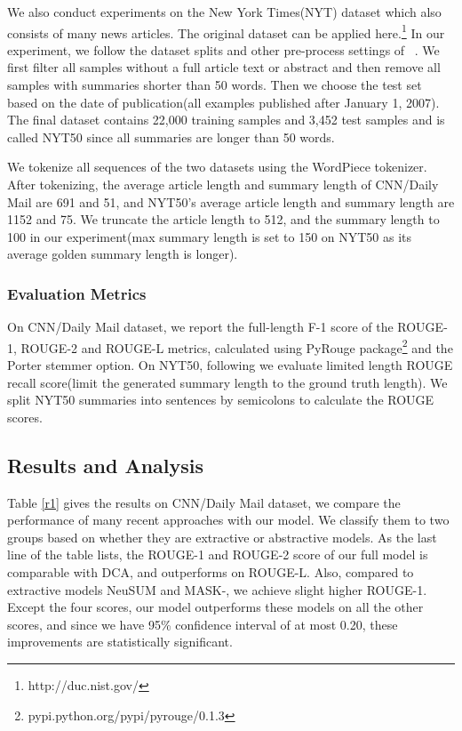 \documentclass{article}
\begin{document}
We also conduct experiments on the New York Times(NYT) dataset which also consists of many news articles. The original dataset can be applied here.\footnote{http://duc.nist.gov/} In our experiment, we follow the dataset splits and other pre-process settings of ~\cite{Durrett2016}.  We first filter all samples without a full article text or abstract and then remove all samples with summaries shorter than 50 words. Then we choose the test set based on the date of publication(all examples published after January 1, 2007). The final dataset contains 22,000 training samples and 3,452 test samples and is called NYT50 since all summaries are longer than 50 words.

We tokenize all sequences of the two datasets using the WordPiece tokenizer. After tokenizing, the average article length and summary length of CNN/Daily Mail are 691 and 51, and NYT50's average article length and summary length are 1152 and 75. We truncate the article length to 512, and the summary length to 100 in our experiment(max summary length is set to 150 on NYT50 as its average golden summary length is longer).


\subsubsection{Evaluation Metrics}
On CNN/Daily Mail dataset, we report the full-length F-1 score of the ROUGE-1, ROUGE-2 and ROUGE-L metrics, calculated using PyRouge package\footnote{pypi.python.org/pypi/pyrouge/0.1.3} and the Porter stemmer option. On NYT50, following \cite{Paulus2018} we evaluate limited length ROUGE recall score(limit the generated summary length to the ground truth length). We split NYT50 summaries into sentences by semicolons to calculate the ROUGE scores.


\subsection{Results and Analysis}

Table \ref{r1} gives the results on CNN/Daily Mail dataset, we compare the performance of many recent approaches with our model. We classify them to two groups based on whether they are extractive or abstractive models. As the last line of the table lists, the ROUGE-1 and ROUGE-2 score of our full model is comparable with DCA, and outperforms on ROUGE-L. Also, compared to extractive models NeuSUM and MASK-, we achieve slight higher ROUGE-1.
Except the four scores, our model outperforms these models on all the other scores, and since we have 95\% confidence interval of at most  0.20, these improvements are statistically significant.
\end{document}
